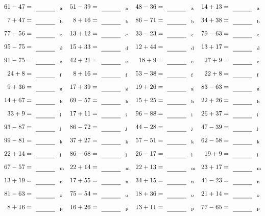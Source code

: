 \documentclass
[
  draft    = true,
  fontsize = 11pt,
  parskip  = half-
]
{scrartcl}
\begin{document}
\clearpage
\begin{align*}
    \pline{61-47}&=\rline{a}
  & \pline{51-39}&=\rline{a}
  & \pline{48-36}&=\rline{a}
  & \pline{14+13}&=\rline{a} \\[1ex]
    \pline{7+47}&=\rline{b}
  & \pline{8+16}&=\rline{b}
  & \pline{86-71}&=\rline{b}
  & \pline{34+38}&=\rline{b} \\[1ex]
    \pline{77-56}&=\rline{c}
  & \pline{13+12}&=\rline{c}
  & \pline{33-23}&=\rline{c}
  & \pline{79-63}&=\rline{c} \\[1ex]
    \pline{95-75}&=\rline{d}
  & \pline{15+33}&=\rline{d}
  & \pline{12+44}&=\rline{d}
  & \pline{13+17}&=\rline{d} \\[1ex]
    \pline{91-75}&=\rline{e}
  & \pline{42+21}&=\rline{e}
  & \pline{18+9}&=\rline{e}
  & \pline{27+9}&=\rline{e} \\[1ex]
    \pline{24+8}&=\rline{f}
  & \pline{8+16}&=\rline{f}
  & \pline{53-38}&=\rline{f}
  & \pline{22+8}&=\rline{f} \\[1ex]
    \pline{9+36}&=\rline{g}
  & \pline{17+39}&=\rline{g}
  & \pline{19+26}&=\rline{g}
  & \pline{83-63}&=\rline{g} \\[1ex]
    \pline{14+67}&=\rline{h}
  & \pline{69-57}&=\rline{h}
  & \pline{15+25}&=\rline{h}
  & \pline{22+26}&=\rline{h} \\[1ex]
    \pline{33+9}&=\rline{i}
  & \pline{17+11}&=\rline{i}
  & \pline{96-88}&=\rline{i}
  & \pline{26+37}&=\rline{i} \\[1ex]
    \pline{93-87}&=\rline{j}
  & \pline{86-72}&=\rline{j}
  & \pline{44-28}&=\rline{j}
  & \pline{47-39}&=\rline{j} \\[1ex]
    \pline{99-81}&=\rline{k}
  & \pline{37+27}&=\rline{k}
  & \pline{57-51}&=\rline{k}
  & \pline{62-58}&=\rline{k} \\[1ex]
    \pline{22+14}&=\rline{l}
  & \pline{86-68}&=\rline{l}
  & \pline{26-17}&=\rline{l}
  & \pline{19+9}&=\rline{l} \\[1ex]
    \pline{67-57}&=\rline{m}
  & \pline{22+14}&=\rline{m}
  & \pline{22+13}&=\rline{m}
  & \pline{23+17}&=\rline{m} \\[1ex]
    \pline{13+19}&=\rline{n}
  & \pline{17+55}&=\rline{n}
  & \pline{34+15}&=\rline{n}
  & \pline{41-23}&=\rline{n} \\[1ex]
    \pline{81-63}&=\rline{o}
  & \pline{75-54}&=\rline{o}
  & \pline{18+36}&=\rline{o}
  & \pline{21+14}&=\rline{o} \\[1ex]
    \pline{8+16}&=\rline{p}
  & \pline{16+26}&=\rline{p}
  & \pline{13+11}&=\rline{p}
  & \pline{77-65}&=\rline{p}
\end{align*}
\end{document}
